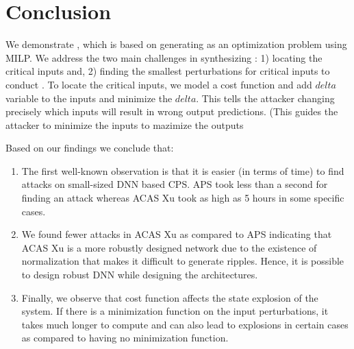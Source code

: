 \chapter{Conclusion}
We demonstrate \tool, which is based on generating \attack as an optimization problem using MILP. We address the two main challenges in synthesizing \attack: 1) locating the critical inputs and, 2) finding the smallest perturbations for critical inputs to conduct \attack. To locate the critical inputs, we model a cost function and add $delta$ variable to the inputs and minimize the $delta$. This tells the attacker changing precisely which inputs will result in wrong output predictions. 
(This guides the attacker to minimize the inputs to mazimize the outputs 


Based on our findings we conclude that:

\begin{enumerate}
    \item The first well-known observation is that it is easier (in terms of time) to find attacks on small-sized DNN based CPS. APS took less than a second for finding an attack whereas ACAS Xu took as high as 5 hours in some specific cases. 

\item We found fewer attacks in ACAS Xu as compared to APS indicating  that ACAS Xu is a more robustly designed network due to the existence of normalization that makes it difficult to generate ripples. Hence, it is possible to design robust DNN while designing the architectures. 

\item Finally, we observe that cost function affects the state explosion of the system. If there is a minimization function on the input perturbations, it takes much longer to compute and can also lead to explosions in certain cases as compared to having no minimization function. 
\end{enumerate}







